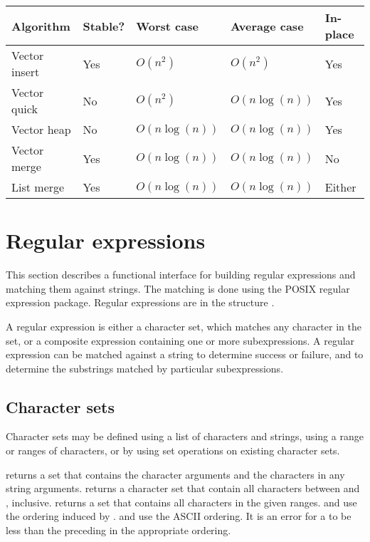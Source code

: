 \begin{center}
  \begin{tabular}{lllll}
Algorithm &    Stable? & Worst case &  Average case &  In-place\\
\hline
Vector insert & Yes&      $O(n^2)$ &     $O(n^2)$&        Yes\\
Vector quick  & No &      $O(n^2)$  &    $O(n\log(n))$&     Yes\\
Vector heap   & No &      $O(n\log(n))$&   $O(n\log(n))$&     Yes\\
Vector merge  & Yes&      $O(n\log(n))$&   $O(n\log(n))$&     No\\
List merge    & Yes&      $O(n\log(n))$&   $O(n\log(n))$&     Either
\end{tabular}
\end{center}

\section{Regular expressions}
\label{regexp-adt}

This section describes a functional interface for building regular
 expressions and matching them against strings.
The matching is done using the POSIX regular expression package.
Regular expressions are in the structure .

A regular expression is either a character set, which matches any character
in the set, or a composite expression containing one or more subexpressions.
A regular expression can be matched against a string to determine success
or failure, and to determine the substrings matched by particular subexpressions.

\subsection{Character sets}

Character sets may be defined using a list of characters and strings,
using a range or ranges of characters, or by using set operations on
existing character sets.

\begin{protos}
\end{protos}
\noindent
{} returns a set that contains the character arguments and the
characters in any string arguments.   returns a character
set that contain all characters between  and ,
inclusive.   returns a set that contains all characters in
the given ranges.   and  use the ordering induced by
.   and  use the
 ASCII ordering.
It is an error for a  to be less than the preceding
  in the appropriate ordering.

